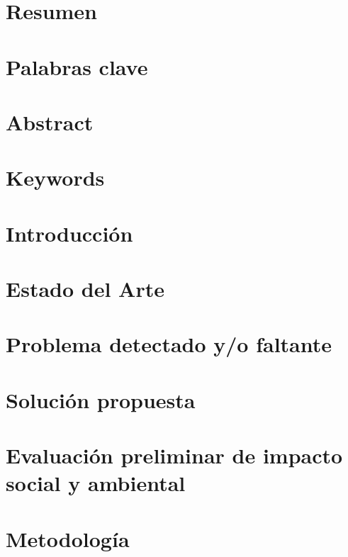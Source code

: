 \documentclass[a4paper,11pt]{article}
\begin{document}


\tableofcontents
\newpage

\section{Resumen}

\newpage

\section{Palabras clave}

\newpage

\section{Abstract}

\newpage

\section{Keywords}

\newpage

\section{Introducción}

\newpage

\section{Estado del Arte}

\newpage

\section{Problema detectado y/o faltante}

\newpage

\section{Solución propuesta}

\newpage

\section{Evaluación preliminar de impacto social y ambiental}

\newpage

\section{Metodología}

\newpage
\end{document}
